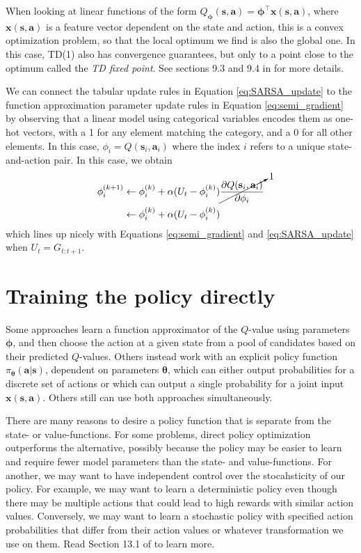 \documentclass{article}
\begin{document}
When looking at linear functions of the form $Q_{\boldsymbol{\phi}}(\mathbf{s},\mathbf{a})=\boldsymbol{\phi}^\top\mathbf{x}(\mathbf{s},\mathbf{a})$, where $\mathbf{x}(\mathbf{s},\mathbf{a})$ is a feature vector dependent on the state and action, this is a convex optimization problem, so that the local optimum we find is also the global one. In this case, TD(1) also has convergence guarantees, but only to a point close to the optimum called the \textit{TD fixed point}. See sections 9.3 and 9.4 in \cite{sutton_barto_rl} for more details.

We can connect the tabular update rules in Equation \ref{eq:SARSA_update} to the function approximation parameter update rules in Equation \ref{eq:semi_gradient} by observing that a linear model using categorical variables encodes them as one-hot vectors, with a 1 for any element matching the category, and a 0 for all other elements. In this case, $\phi_i=Q(\mathbf{s}_i,\mathbf{a}_i)$ where the index $i$ refers to a unique state-and-action pair. In this case, we obtain 
\begin{equation}
\begin{split}
\phi_i^{(k+1)}&\leftarrow\phi_i^{(k)}+\alpha(U_t-\phi_i^{(k)})\cancelto{1}{\frac{\partial Q(\mathbf{s}_i,\mathbf{a}_i)}{\partial \phi_i}}\\&\leftarrow\phi_i^{(k)}+\alpha(U_t-\phi_i^{(k)})\end{split}\end{equation}which lines up nicely with Equations \ref{eq:semi_gradient} and \ref{eq:SARSA_update} when $U_t=G_{t:t+1}$. 

\section{Training the policy directly}

Some approaches learn a function approximator of the $Q$-value using parameters $\boldsymbol{\phi}$, and then choose the action at a given state from a pool of candidates based on their predicted $Q$-values. Others instead work with an explicit policy function $\pi_{\boldsymbol{\theta}}(\mathbf{a}|\mathbf{s})$, dependent on parameters $\boldsymbol{\theta}$, which can either output probabilities for a discrete set of actions or which can output a single probability for a joint input $\mathbf{x}(\mathbf{s}, \mathbf{a})$. Others still can use both approaches simultaneously.

There are many reasons to desire a policy function that is separate from the state- or value-functions. For some problems, direct policy optimization outperforms the alternative, possibly because the policy may be easier to learn and require fewer model parameters than the state- and value-functions. For another, we may want to have independent control over the stocahsticity of our policy. For example, we may want to learn a deterministic policy even though there may be multiple actions that could lead to high rewards with similar action values. Conversely, we may want to learn a stochastic policy with specified action probabilities that differ from their action values or whatever transformation we use on them.  Read Section 13.1 of \cite{sutton_barto_rl} to learn more.
\end{document}

